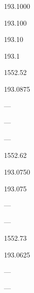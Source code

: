 \documentclass[letterpaper,10pt,english]{sphinxmanual}
\begin{document}
193.1000





193.100





193.10





193.1





1552.52









193.0875





—





—





—





1552.62









193.0750





193.075





—





—





1552.73









193.0625





—





—
\end{document}
